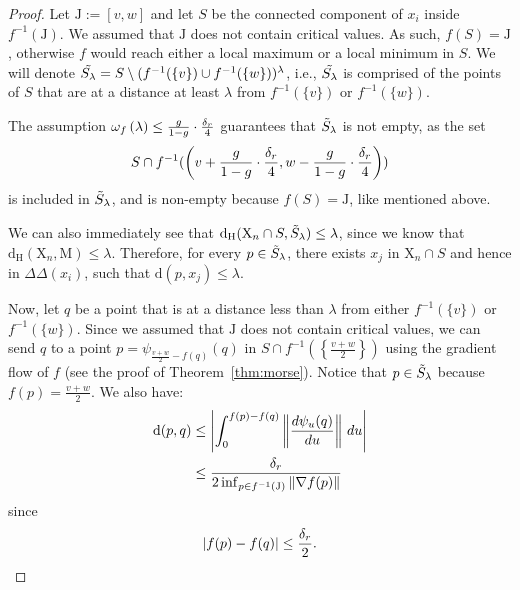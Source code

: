 \documentclass[pdflatex,sn-mathphys-ay]{sn-jnl}%
\newcommand{\man}{\mathrm{M}}
\newcommand{\sample}{\mathrm{X}}
\newcommand{\dis}{\mathrm{d}}
\newcommand{\haus}{{\mathrm {d_H}}}
\newcommand{\DD}{\Delta\!\!\!\!\Delta}
\newcommand{\coverwidth}{\change{\delta_r}}
\newcommand{\preim}[2]{#1^{-1}(#2)}
\newcommand{\change}[1]{\noindent #1}
\theoremstyle{thmstyleone}%
\begin{document}
\begin{proof}
Let $\mathrm{J}:=[v,w]$ and let $S$ be the connected component of $x_i$ inside $\preim{f}{\mathrm{J}}$. 
We assumed that $\mathrm{J}$ does not contain critical values. As such, $f\left(S\right)=\mathrm{J}$, otherwise $f$ would reach either a local maximum or a local minimum in $S$. 
We will denote $\Tilde{S_\lambda}=S\setminus (\preim{f}{\{v\}}\cup \preim{f}{\{w\}})^{\lambda}$, i.e., $\Tilde{S_\lambda}$ is comprised of the points of $S$ that %
are at a distance at least $\lambda$ from $\preim{f}{\{v\}}$ or $\preim{f}{\{w\}}$.

The assumption $\omega_f\left(\lambda\right)\leq\frac{g}{1-g}\cdot\frac{\coverwidth}{4}$ guarantees that $\Tilde{S}_\lambda$ is not empty, as the set
$$S\cap \preim{f}{ \left(v+\frac{g}{1-g}\cdot\frac{\coverwidth}{4},w-\frac{g}{1-g}\cdot\frac{\coverwidth}{4}\right)}$$
is included in $\Tilde{S}_\lambda$, and is non-empty  
because $f\left(S\right)=\mathrm{J}$, like mentioned above. 

We can also immediately see that $\haus(\sample_n\cap S,\Tilde{S}_\lambda)\leq\lambda$, since we know that $\haus(\sample_n,\man)\leq \lambda$.
Therefore, for every $p\in\Tilde{S}_\lambda$, there exists $x_j$ in $\sample_n\cap S$ and hence in $\DD(x_i)$, such that $\dis(p,x_j)\leq\lambda$.


Now, let $q$ be a point that is at a distance less than $\lambda$ from either $\preim{f}{\{v\}}$ or $\preim{f}{\{w\}}$. Since we assumed that $\mathrm{J}$ does not contain critical values, we can send $q$ to a point $p=\psi_{\frac{v+w}{2}-f(q)}(q)$ in $S\cap \preim{f}{\left\{\frac{v+w}{2}\right\}}$ using the gradient flow of $f$ (see the proof of Theorem~\ref{thm:morse}). Notice that $p\in\Tilde{S}_\lambda$ because $f(p)=\frac{v+w}{2}$. 
We also have:
\begin{align*}
\dis(p,q)&\leq\left|\int_{0}^{f(p)-f(q)}\left\Vert\frac{d\psi_{u}(q)}{du}\right\Vert\,du \right| \\
&\leq\frac{\coverwidth}{2\inf_{p\in \preim{f}{\mathrm{J}}}\Vert\nabla f(p)\Vert}
\end{align*}
since $$\left|f(p)-f(q)\right|\leq \frac{\coverwidth}{2}.$$


\end{proof}
\end{document}
